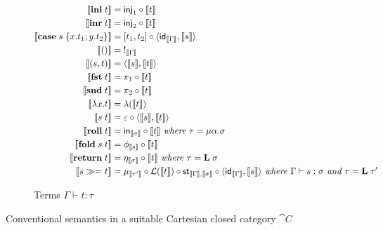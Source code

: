 \begin{figure}
\begin{subfigure}{\linewidth}
\begin{align*}
  \\
  \sem{\tmInl{t}} &= \mathsf{inj}_1 \comp \sem{t}
  \\
  \sem{\tmInr{t}} &= \mathsf{inj}_2 \comp \sem{t}
  \\
  \sem{\tmCase{s}{x}{t_1}{y}{t_2}} &= \coprodM{t_1}{t_2} \comp \prodM{\id_{\sem{\Gamma}}}{\sem{s}}
  \\
  \sem{\tmUnit} &=\;!_{\sem{\Gamma}}
  \\
  \sem{\tmPair{s}{t}} &= \prodM{\sem{s}}{\sem{t}}
  \\
  \sem{\tmFst{t}} &= \pi_1 \comp \sem{t}
  \\
  \sem{\tmSnd{t}} &= \pi_2 \comp \sem{t}
  \\
  \sem{\tmFun{x}{t}} &= \lambda(\sem{t})
  \\
  \sem{\tmApp{s}{t}} &= \eval \comp \prodM{\sem{s}}{\sem{t}}
  \\
  \sem{\tmRoll{t}} &= \inMap_{\sem{\sigma}} \comp \sem{t}
  \textit{ where }\tau = \mu\alpha.\sigma
  \\
  \sem{\tmFold{s}{t}} &= \phi_{\sem{s}} \comp \sem{t}
  \\
  \sem{\tmReturn{t}} &= \eta_{\sem{\sigma}} \comp \sem{t}
  \textit{ where }\tau = \tyLift\;\sigma
  \\
  \sem{\tmBind{s}{t}} &= \mu_{\sem{\tau'}} \comp \mathcal{L}(\sem{t}) \comp \mathsf{st}_{\sem{\Gamma},\sem{\sigma}} \comp \prodM{\id_{\sem{\Gamma}}}{\sem{s}}
  \textit{ where }\Gamma \vdash s: \sigma\textit{ and }\tau = \tyLift\;\tau'
  \end{align*}
  \caption{Terms $\Gamma \vdash t: \tau$}
  \label{fig:default-semantics:terms}
\end{subfigure}
\caption{Conventional semantics in a suitable Cartesian closed category $\cat{C}$}
\end{figure}
